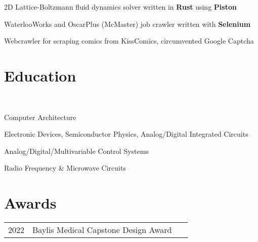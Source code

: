 \documentclass[]{chandan-cv}
\begin{document}
\begin{minipage}[t]{0.77\textwidth}
\descript{ }
\location{ }
\begin{tightemize}
	\item 2D Lattice-Boltzmann fluid dynamics solver written in \textbf{Rust} using \textbf{Piston}
	\item WaterlooWorks and OscarPlus (McMaster) job crawler written with \textbf{Selenium}
	\item Webcrawler for scraping comics from KissComics, circumvented Google Captcha
\end{tightemize}
\sectionsep

\section{Education}

 \\


\descript{ }
\location{ }
\begin{tightemize}
        \item Computer Architecture
		\item Electronic Devices, Semiconductor Physics, Analog/Digital Integrated Circuits
		\item Analog/Digital/Multivariable Control Systems
		\item Radio Frequency \& Microwave Circuits
\end{tightemize}
\sectionsep


\section{Awards}
\begin{tabular}{rll}
2022		&	Baylis Medical Capstone Design Award\
\end{tabular}
\sectionsep
\end{minipage}
\end{document}

